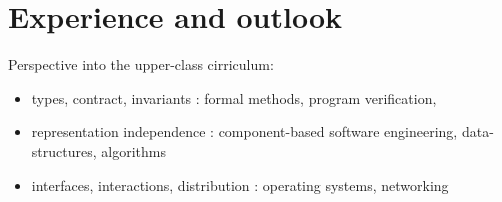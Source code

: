 \documentclass[submission,copyright]{eptcs}
\begin{document}
\section{Experience and outlook}

Perspective into the upper-class cirriculum:

\begin{itemize}
\item types, contract, invariants : formal methods, program verification,
  
\item representation independence : component-based software engineering,
  data-structures, algorithms

\item interfaces, interactions, distribution : operating systems, networking
\end{itemize}



\end{document}
